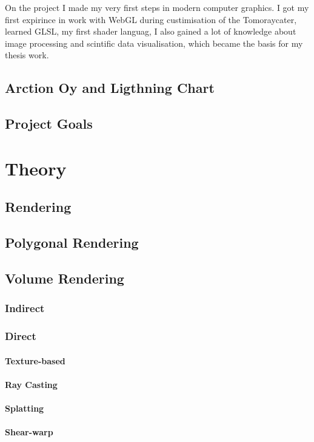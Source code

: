 \documentclass[english]{report}
\begin{document}
On the project I made my very first steps in modern computer graphics. I got my first expirince in work with WebGL during custimisation of the Tomoraycater, learned GLSL, my first shader languag, I also gained a lot of knowledge about image processing and scintific data visualisation, which became the basis for my thesis work.


\section{Arction Oy and Ligthning Chart}


\section{Project Goals}


\chapter{Theory}
\section{Rendering}
\section{Polygonal Rendering}
\section{Volume Rendering}
\subsection{Indirect}
\subsection{Direct}
\subsubsection{Texture-based}
\subsubsection{Ray Casting}
\subsubsection{Splatting}
\subsubsection{Shear-warp}
\end{document}

